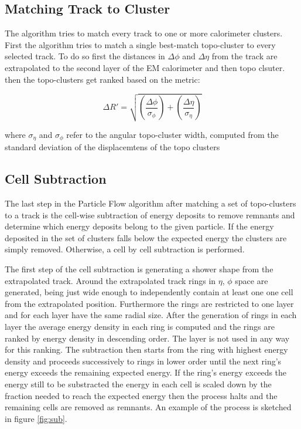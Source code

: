 \subsection{Matching Track to Cluster}

The algorithm tries to match every track to one or more calorimeter clusters. First the algorithm tries to match a single best-match topo-cluster to every selected track.
To do so first the distances in $\Delta \phi$ and $\Delta \eta$ from the track are extrapolated to the second layer of the EM calorimeter and then topo clsuter. then the topo-clusters get ranked based on the metric:

\begin{equation}
\Delta R' = \sqrt{\left(\frac{\Delta \phi}{\sigma_{\phi}}\right)+\left(\frac{\Delta \eta}{\sigma_{\eta}}\right)}
\end{equation}

where $\sigma_{\eta}$ and $\sigma_{\phi}$ refer to the angular topo-cluster width, computed from the standard deviation of the displacemtens of the topo clusters 

\subsection{Cell Subtraction}

The last step in the Particle Flow algorithm after matching a set of topo-clusters to a track is the cell-wise subtraction of energy deposits to remove remnants and determine which energy deposits belong to the given particle.
If the energy deposited in the set of clusters falls below the expected energy the clusters are simply removed. Otherwise, a cell by cell subtraction is performed.

The first step of the cell subtraction is generating a shower shape from the extrapolated track. Around the extrapolated track rings in $\eta$, $\phi$ space are generated, being just wide enough to independently contain at least one one cell from the extrapolated position. Furthermore the rings are restricted to one layer and for each layer have the same radial size.
After the generation of rings in each layer the average energy density in each ring is computed and the rings are ranked by energy density in descending order. The layer is not used in any way for this ranking.
The subtraction then starts from the ring with highest energy density and proceeds successively to rings in lower order until the next ring's energy exceeds the remaining expected energy.
If the ring's energy exceeds the energy still to be substracted the energy in each cell is scaled down by the fraction needed to reach the expected energy then the process halts and the remaining cells are removed as remnants.
An example of the process is sketched in figure \ref{fig:sub}. 



